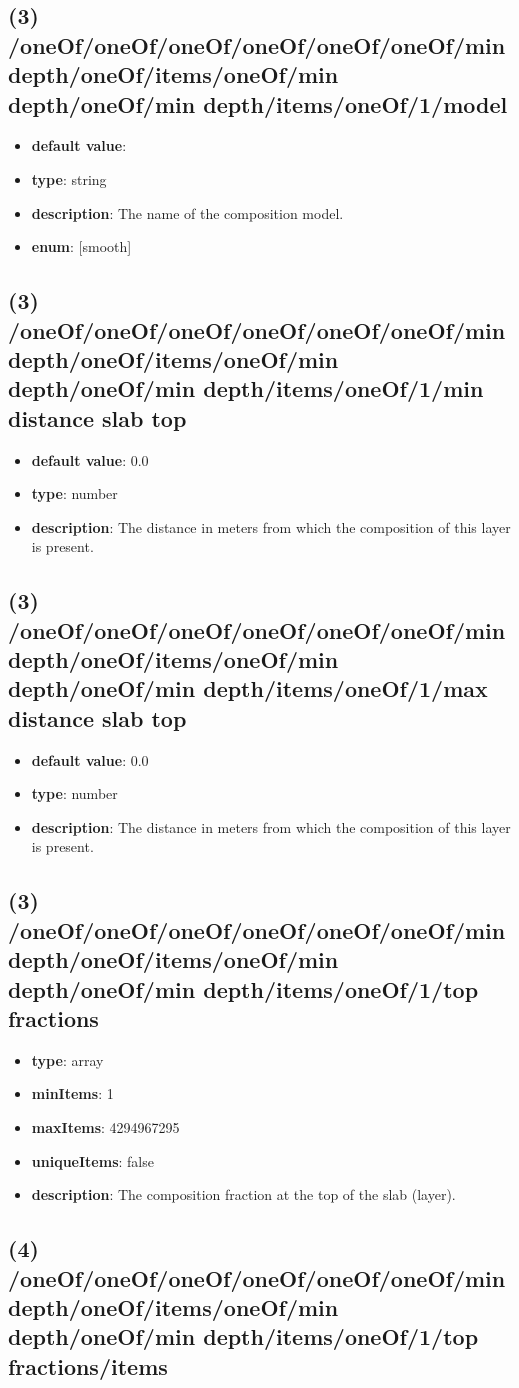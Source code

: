 \subsection{(3) /oneOf/oneOf/oneOf/oneOf/oneOf/oneOf/min depth/oneOf/items/oneOf/min depth/oneOf/min depth/items/oneOf/1/model}
\begin{itemize}[leftmargin=3em]\item {\bf default value}: 
\item {\bf type}: string
\item {\bf description}: The name of the composition model.
\item {\bf enum}: [smooth]\end{itemize}\subsection{(3) /oneOf/oneOf/oneOf/oneOf/oneOf/oneOf/min depth/oneOf/items/oneOf/min depth/oneOf/min depth/items/oneOf/1/min distance slab top}
\begin{itemize}[leftmargin=3em]\item {\bf default value}: 0.0
\item {\bf type}: number
\item {\bf description}: The distance in meters from which the composition of this layer is present.
\end{itemize}\subsection{(3) /oneOf/oneOf/oneOf/oneOf/oneOf/oneOf/min depth/oneOf/items/oneOf/min depth/oneOf/min depth/items/oneOf/1/max distance slab top}
\begin{itemize}[leftmargin=3em]\item {\bf default value}: 0.0
\item {\bf type}: number
\item {\bf description}: The distance in meters from which the composition of this layer is present.
\end{itemize}\subsection{(3) /oneOf/oneOf/oneOf/oneOf/oneOf/oneOf/min depth/oneOf/items/oneOf/min depth/oneOf/min depth/items/oneOf/1/top fractions}
\begin{itemize}[leftmargin=3em]\item {\bf type}: array
\item {\bf minItems}: 1
\item {\bf maxItems}: 4294967295
\item {\bf uniqueItems}: false
\item {\bf description}: The composition fraction at the top of the slab (layer).
\end{itemize}\subsection{(4) /oneOf/oneOf/oneOf/oneOf/oneOf/oneOf/min depth/oneOf/items/oneOf/min depth/oneOf/min depth/items/oneOf/1/top fractions/items}
